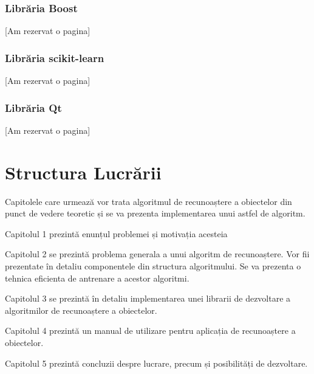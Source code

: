 



\subsubsection{Librăria Boost}
[Am rezervat o pagina]
\pagebreak


\subsubsection{Librăria scikit-learn}
[Am rezervat o pagina]
\pagebreak


\subsubsection{Librăria Qt}
[Am rezervat o pagina]
\pagebreak

\section{Structura Lucrării}
Capitolele care urmează vor trata algoritmul de recunoaștere a obiectelor din punct de vedere teoretic și se va prezenta implementarea unui astfel de algoritm.

Capitolul 1 prezintă enunțul problemei și motivația acesteia

Capitolul 2 se prezintă problema generala a unui algoritm de recunoaștere.
Vor fii prezentate în detaliu componentele din structura algoritmului.
Se va prezenta o tehnica eficienta de antrenare a acestor algoritmi.

Capitolul 3 se prezintă în detaliu implementarea unei librarii de dezvoltare a algoritmilor de recunoaștere a obiectelor.

Capitolul 4 prezintă un manual de utilizare pentru aplicația de recunoaștere a obiectelor.

Capitolul 5 prezintă concluzii despre lucrare, precum și posibilități de dezvoltare.

\pagebreak